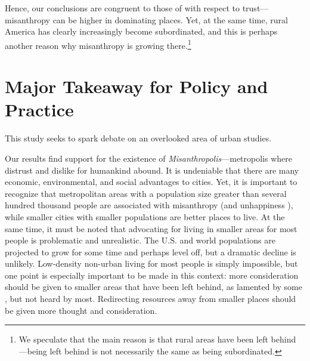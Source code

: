 \documentclass[11pt, letterpaper]{article}
\begin{document}
\begin{spacing}{1.4}
Hence, our conclusions are congruent to those of \citet{schilke15} with respect to trust---misanthropy can be higher in dominating places. Yet, at the same
 time, rural America has clearly increasingly become subordinated, and this is perhaps another reason why misanthropy is growing there.\footnote{We speculate that the main reason is that rural areas have been left behind \citep{hansonCityJournalautumn15,hansonCJ17winter17,fullerNYT17monD}---being left behind is not necessarily the same as being subordinated.}  

\section*{Major Takeaway for Policy and Practice}

This study seeks to spark debate on an overlooked area of urban studies. %

Our results find  support for the existence of
\emph{Misanthropolis}---metropolis where distrust and dislike for humankind
abound. It is undeniable that there are many economic, environmental, and social
advantages to cities. Yet, it is important to recognize that metropolitan areas
with a population size greater than several hundred thousand people are
associated with misanthropy (and unhappiness \citep{aok-ls_fisher16}), while
smaller cities with smaller populations are better places to live. At the same
time, it must be noted that advocating for living in smaller areas for most people is problematic and unrealistic. The U.S. and world populations are projected to grow for some time and perhaps level off, but a dramatic decline is unlikely. Low-density non-urban living for most people is simply impossible, but one point is especially important to be made in this context: more consideration should be given to smaller areas that have been left behind, as lamented by some \citep[e.g.,][]{fullerNYT17monD,hansonCityJournalautumn15}, but not heard by most. Redirecting resources away from smaller places should be given more thought and consideration.


\end{spacing}
\end{document}
